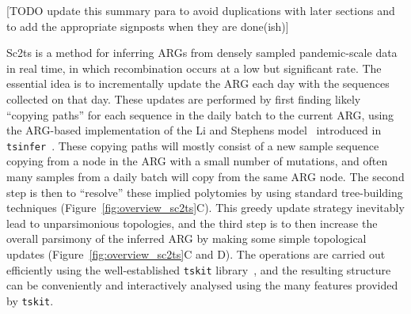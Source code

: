\documentclass{article}
\begin{document}
[TODO update this summary para to avoid duplications with
later sections and to add the appropriate signposts
when they are done(ish)]

Sc2ts is a method for inferring ARGs from densely sampled pandemic-scale data
in real time, in which recombination occurs at a low but significant rate.
The essential idea is to incrementally update the ARG each day
with the sequences collected on that day. These updates are performed by
first finding likely ``copying paths'' for each sequence in the daily
batch to the current ARG, using the ARG-based implementation of
the Li and Stephens model~\citep{Li2003-ib} introduced
in \texttt{tsinfer}~\citep{Kelleher2019-ba}.
These copying paths
will mostly consist of a new sample sequence copying from a node in the ARG
with a small number of mutations, and often many samples
from a daily batch will copy from the same ARG node. The second
step is then to ``resolve'' these implied polytomies by using
standard tree-building techniques (Figure~\ref{fig:overview_sc2ts}C).
This greedy update strategy inevitably lead to unparsimonious
topologies, and the third step is to then increase the
overall parsimony of the inferred ARG by making some simple topological
updates (Figure~\ref{fig:overview_sc2ts}C and D).
The operations are carried out efficiently using the well-established
\texttt{tskit}
library~\citep{Kelleher2018-xc,Ralph2020-efficiently,Tskit2023-tskit},
and the resulting structure can be conveniently and interactively
analysed using the many features provided by \texttt{tskit}.
\end{document}
